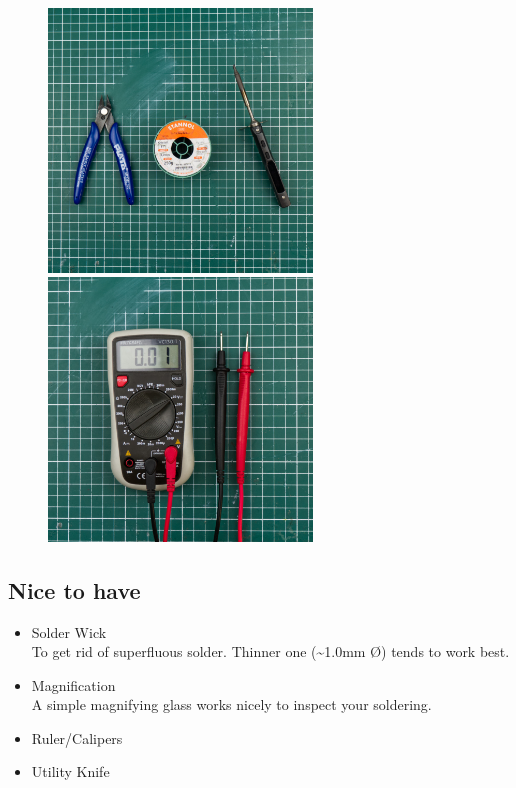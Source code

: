 \documentclass[12pt, a4paper]{article}
\begin{document}
\begin{figure}[H]
    \centering
    \includegraphics[width=7cm]{images/tools_main.jpg}
    \hspace{2mm}
    \includegraphics[width=7cm]{images/tools_multimeter.jpg}
\end{figure}

\subsection*{Nice to have}

\begin{itemize}
    \item Solder Wick
    \\ {\small To get rid of superfluous solder.
    Thinner one (\textasciitilde1.0mm \O) tends to work best.}
    \item Magnification
    \\ {\small A simple magnifying glass works nicely to inspect your soldering.}
    \item Ruler/Calipers
    \item Utility Knife
\end{itemize}
\end{document}

